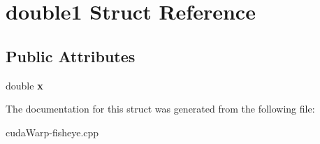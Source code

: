 \hypertarget{structdouble1}{}\section{double1 Struct Reference}
\label{structdouble1}
\subsection*{Public Attributes}
\begin{DoxyCompactItemize}
\item 
double {\bfseries x}\hypertarget{structdouble1_a52b90dd6310fdd5d4fe27ffc686ebf28}{}\label{structdouble1_a52b90dd6310fdd5d4fe27ffc686ebf28}

\end{DoxyCompactItemize}


The documentation for this struct was generated from the following file\+:\begin{DoxyCompactItemize}
\item 
cuda\+Warp-\/fisheye.\+cpp\end{DoxyCompactItemize}
